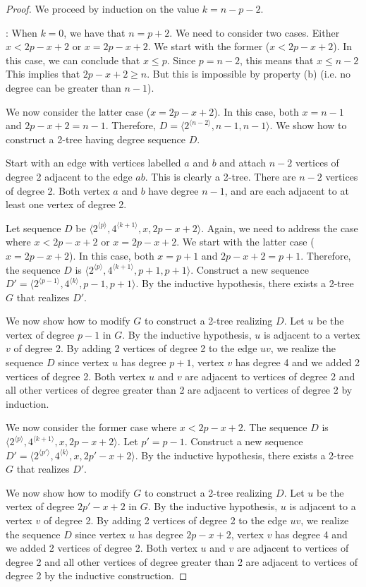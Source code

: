 \documentclass[lotsofwhite,charterfonts]{patmorin}
\newcommand{\rep}[1]{^{\langle#1\rangle}}
\begin{document}
\begin{proof}
We proceed by induction on the value $k=n-p-2$. 

: When $k=0$, we have that $n=p+2$.
We need to consider two cases. Either $x<2p-x+2$ or $x=2p-x+2$. We
start with the former ($x<2p-x+2$).  In this case, we can conclude
that $x\leq p$. Since $p=n-2$, this means that $x\leq n-2$ This
implies that $2p-x+2\geq n$. But this is impossible by property (b)
(i.e.  no degree can be greater than $n-1$).

We now consider the latter case ($x=2p-x+2$). In this case, both
$x=n-1$ and $2p-x+2=n-1$. Therefore, $D=\langle
2\rep{n-2},n-1,n-1\rangle$.  We show how to construct a 2-tree having
degree sequence $D$.

Start with an edge with vertices labelled $a$ and $b$ and attach $n-2$
vertices of degree 2 adjacent to the edge $ab$. This is clearly a
2-tree. There are $n-2$ vertices of degree 2. Both vertex $a$ and $b$
have degree $n-1$, and are each adjacent to at least one vertex of
degree 2.

 Let sequence $D$ be $\langle
2\rep{p},4\rep{k+1},x,2p-x+2\rangle$. Again, we need to address the
case where $x<2p-x+2$ or $x=2p-x+2$. We start with the latter case
($x=2p-x+2$).  In this case, both $x=p+1$ and $2p-x+2=p+1$.
Therefore, the sequence $D$ is $\langle
2\rep{p},4\rep{k+1},p+1,p+1\rangle$.  Construct a new sequence $D' =
\langle 2\rep{p-1},4\rep{k},p-1,p+1\rangle$. By the inductive
hypothesis, there exists a 2-tree $G$ that realizes $D'$. 

We now show how to modify $G$ to construct a 2-tree realizing $D$.
Let $u$ be the vertex of degree $p-1$ in $G$.  By the inductive
hypothesis, $u$ is adjacent to a vertex $v$ of degree 2.  By adding 2
vertices of degree 2 to the edge $uv$, we realize the sequence $D$
since vertex $u$ has degree $p+1$, vertex $v$ has degree 4 and we
added 2 vertices of degree 2. Both vertex $u$ and $v$ are adjacent to
vertices of degree 2 and all other vertices of degree greater than 2
are adjacent to vertices of degree 2 by induction.

We now consider the former case where $x<2p-x+2$.  The sequence $D$ is
$\langle 2\rep{p},4\rep{k+1},x,2p-x+2\rangle$.  Let $p'=p-1$.
Construct a new sequence $D' = \langle
2\rep{p'},4\rep{k},x,2p'-x+2\rangle$. By the inductive hypothesis,
there exists a 2-tree $G$ that realizes $D'$. 

We now show how to modify $G$ to construct a 2-tree realizing $D$.
Let $u$ be the vertex of degree $2p'-x+2$ in $G$.  By the inductive
hypothesis, $u$ is adjacent to a vertex $v$ of degree 2.  By adding 2
vertices of degree 2 to the edge $uv$, we realize the sequence $D$
since vertex $u$ has degree $2p-x+2$, vertex $v$ has degree 4 and we
added 2 vertices of degree 2. Both vertex $u$ and $v$ are adjacent to
vertices of degree 2 and all other vertices of degree greater than 2
are adjacent to vertices of degree 2 by the inductive construction.
\end{proof}
\end{document}
